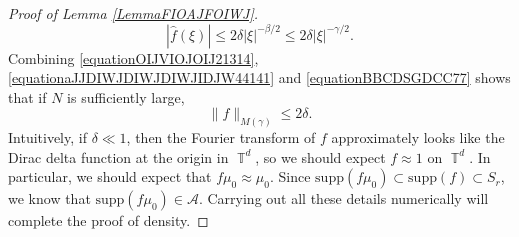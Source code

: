 \documentclass[dvipsnames,letterpaper,12pt]{article}
\numberwithin{equation}{section}
\DeclareMathOperator{\TT}{\mathbb{T}}
\numberwithin{theorem}{section}
\begin{document}
\begin{proof}[Proof of Lemma \ref{LemmaFIOAJFOIWJ}]
    \begin{equation} \label{equationBBCDSGDCC77}
        |\widehat{f}(\xi)| \leq 2 \delta |\xi|^{-\beta/2} \leq 2 \delta |\xi|^{- \gamma/2}.
    \end{equation}
    Combining \eqref{equationOIJVIOJOIJ21314}, \eqref{equationaJJDIWJDIWJDIWJIDJW44141} and \eqref{equationBBCDSGDCC77} shows that if $N$ is sufficiently large,
    \begin{equation} \label{equationCIOJCIOJAOCIJAWDI41412421}
        \| f \|_{M(\gamma)} \leq 2 \delta.
    \end{equation}
    Intuitively, if $\delta \ll 1$, then the Fourier transform of $f$ approximately looks like the Dirac delta function at the origin in $\TT^d$, so we should expect $f \approx 1$ on $\TT^d$. In particular, we should expect that $f \mu_0 \approx \mu_0$. Since $\text{supp}(f \mu_0) \subset \text{supp}(f) \subset S_r$, we know that $\text{supp}(f \mu_0) \in \mathcal{A}$. Carrying out all these details numerically will complete the proof of density.


\end{proof}
\end{document}

